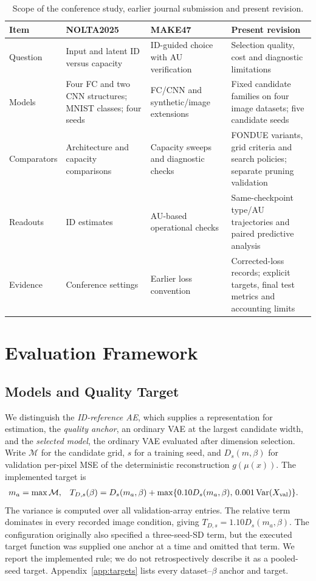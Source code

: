 \documentclass[make,article,submit,pdftex,moreauthors]{Definitions/mdpi}
\begin{document}
\begin{table}[H]
\caption{Scope of the conference study, earlier journal submission and present revision.}
\label{tab:history}\small
\begin{tabularx}{\textwidth}{lXXX}\toprule
Item & NOLTA2025 & MAKE47 & Present revision \\\midrule
Question & Input and latent ID versus capacity & ID-guided choice with AU verification & Selection quality, cost and diagnostic limitations \\
Models & Four FC and two CNN structures; MNIST classes; four seeds & FC/CNN and synthetic/image extensions & Fixed candidate families on four image datasets; five candidate seeds \\
Comparators & Architecture and capacity comparisons & Capacity sweeps and diagnostic checks & FONDUE variants, grid criteria and search policies; separate pruning validation \\
Readouts & ID estimates & AU-based operational checks & Same-checkpoint type/AU trajectories and paired predictive analysis \\
Evidence & Conference settings & Earlier loss convention & Corrected-loss records; explicit targets, final test metrics and accounting limits \\
\bottomrule\end{tabularx}
\end{table}

\section{Evaluation Framework}\label{sec:framework}

\subsection{Models and Quality Target}\label{sec:quality}
We distinguish the \emph{ID-reference AE}, which supplies a representation
for estimation, the \emph{quality anchor}, an ordinary VAE at the largest
candidate width, and the \emph{selected model}, the ordinary VAE evaluated
after dimension selection. Write $\mathcal M$ for the candidate grid,
$s$ for a training seed, and $D_s(m,\beta)$ for validation per-pixel MSE
of the deterministic reconstruction $g(\mu(x))$. The implemented target is
\begin{align}
 m_a&=\max\mathcal M, &
 T_{D,s}(\beta)&=D_s(m_a,\beta)
 +\max\{0.10D_s(m_a,\beta),\,0.001\operatorname{Var}(X_{\rm val})\}.
 \label{eq:target}
\end{align}
The variance is computed over all validation-array entries. The relative
term dominates in every recorded image condition, giving
$T_{D,s}=1.10D_s(m_a,\beta)$. The configuration originally also specified a
three-seed-SD term, but the executed target function was supplied one
anchor at a time and omitted that term. We report the implemented rule;
we do not retrospectively describe it as a pooled-seed target.
Appendix~\ref{app:targets} lists every dataset--$\beta$ anchor and target.
\end{document}
